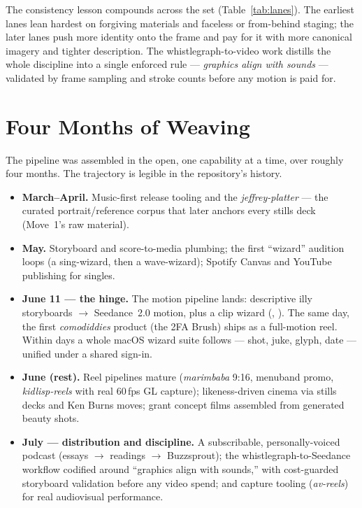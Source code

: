 \documentclass[10pt,letterpaper,twocolumn]{article}
\begin{document}
The consistency lesson compounds across the set (Table~\ref{tab:lanes}).
The earliest lanes lean hardest on forgiving materials and faceless or
from-behind staging; the later lanes push more identity onto the frame and
pay for it with more canonical imagery and tighter description. The
whistlegraph-to-video work distills the whole discipline into a single
enforced rule --- \emph{graphics align with sounds} --- validated by frame
sampling and stroke counts before any motion is paid for.

\section{Four Months of Weaving}
\label{sec:timeline}

The pipeline was assembled in the open, one capability at a time, over
roughly four months. The trajectory is legible in the repository's history.

\begin{itemize}
  \item \textbf{March--April.} Music-first release tooling and the
  \emph{jeffrey-platter} --- the curated portrait/reference corpus that
  later anchors every stills deck (Move~1's raw material).
  \item \textbf{May.} Storyboard and score-to-media plumbing; the first
  ``wizard'' audition loops (a sing-wizard, then a wave-wizard); Spotify
  Canvas and YouTube publishing for singles.
  \item \textbf{June 11 --- the hinge.} The motion pipeline lands:
  descriptive illy storyboards $\to$ Seedance~2.0 motion, plus a clip
  wizard (, ). The
  same day, the first \emph{comodiddies} product (the 2FA Brush) ships as a
  full-motion reel. Within days a whole macOS wizard suite follows ---
  shot, juke, glyph, date --- unified under a shared sign-in.
  \item \textbf{June (rest).} Reel pipelines mature (\emph{marimbaba} 9:16,
  menuband promo, \emph{kidlisp-reels} with real 60\,fps GL capture);
  likeness-driven cinema via  stills decks and Ken Burns
  moves; grant concept films assembled from generated beauty shots.
  \item \textbf{July --- distribution and discipline.} A subscribable,
  personally-voiced podcast (essays $\to$ readings $\to$ Buzzsprout); the
  whistlegraph-to-Seedance workflow codified around ``graphics align with
  sounds,'' with cost-guarded storyboard validation before any video spend;
  and capture tooling (\emph{av-reels}) for real audiovisual performance.
\end{itemize}
\end{document}
